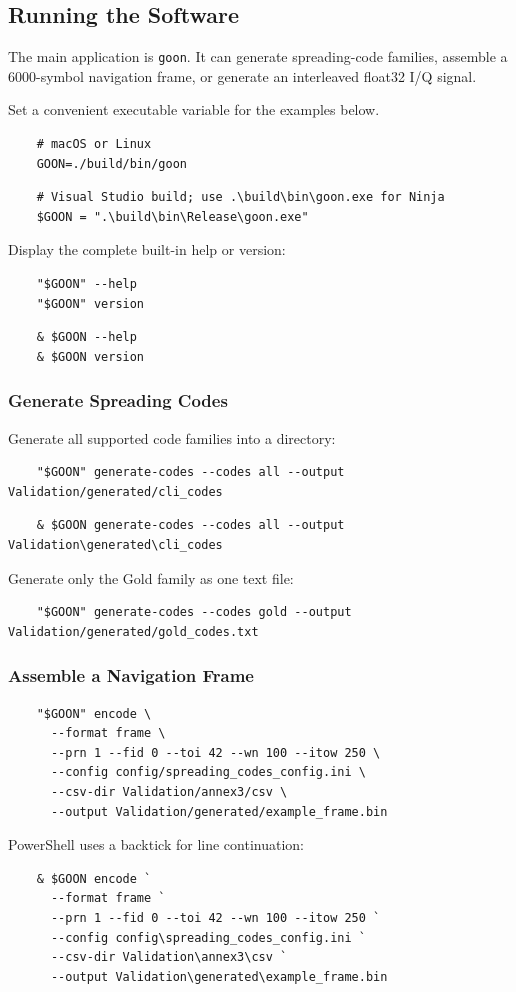 \documentclass{article}
\begin{document}
\subsection*{Running the Software}

The main application is \verb|goon|. It can generate spreading-code families, assemble a 6000-symbol navigation frame, or generate an interleaved float32 I/Q signal.

Set a convenient executable variable for the examples below.
\begin{verbatim}
    # macOS or Linux
    GOON=./build/bin/goon
\end{verbatim}
\begin{verbatim}
    # Visual Studio build; use .\build\bin\goon.exe for Ninja
    $GOON = ".\build\bin\Release\goon.exe"
\end{verbatim}
Display the complete built-in help or version:
\begin{verbatim}
    "$GOON" --help
    "$GOON" version
\end{verbatim}
\begin{verbatim}
    & $GOON --help
    & $GOON version
\end{verbatim}

\subsubsection*{Generate Spreading Codes}

Generate all supported code families into a directory:
\begin{verbatim}
    "$GOON" generate-codes --codes all --output Validation/generated/cli_codes
\end{verbatim}
\begin{verbatim}
    & $GOON generate-codes --codes all --output Validation\generated\cli_codes
\end{verbatim}
Generate only the Gold family as one text file:
\begin{verbatim}
    "$GOON" generate-codes --codes gold --output Validation/generated/gold_codes.txt
\end{verbatim}

\subsubsection*{Assemble a Navigation Frame}

\begin{verbatim}
    "$GOON" encode \
      --format frame \
      --prn 1 --fid 0 --toi 42 --wn 100 --itow 250 \
      --config config/spreading_codes_config.ini \
      --csv-dir Validation/annex3/csv \
      --output Validation/generated/example_frame.bin
\end{verbatim}
PowerShell uses a backtick for line continuation: 
\begin{verbatim}
    & $GOON encode `
      --format frame `
      --prn 1 --fid 0 --toi 42 --wn 100 --itow 250 `
      --config config\spreading_codes_config.ini `
      --csv-dir Validation\annex3\csv `
      --output Validation\generated\example_frame.bin
\end{verbatim}
\end{document}
